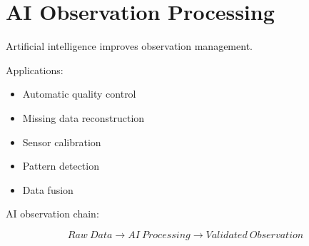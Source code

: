 \section{AI Observation Processing}


Artificial intelligence improves observation management.



Applications:


\begin{itemize}

\item Automatic quality control

\item Missing data reconstruction

\item Sensor calibration

\item Pattern detection

\item Data fusion

\end{itemize}



AI observation chain:


\[
Raw\ Data
\rightarrow
AI\ Processing
\rightarrow
Validated\ Observation
\]
